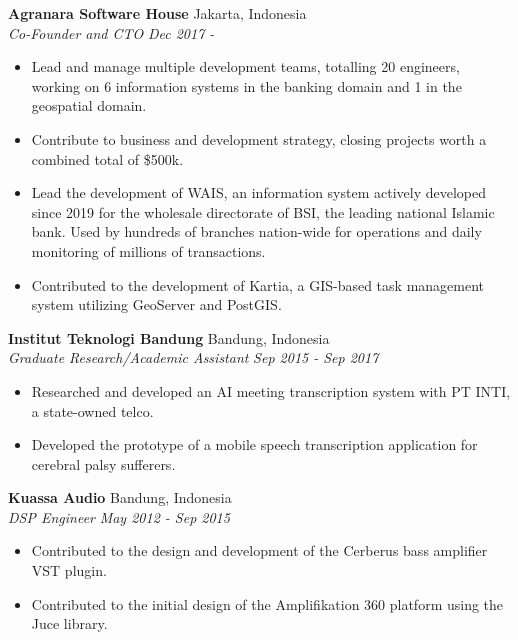 \documentclass{article}
\begin{document}
\textbf{Agranara Software House} \hfill Jakarta, Indonesia\\
\vspace{1mm}
\emph{Co-Founder and CTO} \hfill \emph{Dec 2017 -}\\
\vspace{-3mm}
\begin{itemize}[align=left, left=0pt..1em, itemsep=-2pt]
  \item Lead and manage multiple development teams, totalling 20 engineers,
    working on 6 information systems in the banking domain and 1 in the
    geospatial domain.
  \item Contribute to business and development strategy, closing projects
    worth a combined total of \$500k.
  \item Lead the development of WAIS, an information system actively
    developed since 2019 for the wholesale directorate of BSI, the leading
    national Islamic bank. Used by hundreds of branches nation-wide for
    operations and daily monitoring of millions of transactions.
  \item Contributed to the development of Kartia, a GIS-based task management
    system utilizing GeoServer and PostGIS. 
\end{itemize}

\textbf{Institut Teknologi Bandung} \hfill Bandung, Indonesia\\
\vspace{1mm}
\emph{Graduate Research/Academic Assistant} \hfill \emph{Sep 2015 - Sep 2017}\\
\vspace{-3mm}
\begin{itemize}[align=left, left=0pt..1em, itemsep=-2pt]
  \item Researched and developed an AI meeting transcription system with PT INTI, a
    state-owned telco.
  \item Developed the prototype of a mobile speech transcription application for
    cerebral palsy sufferers.
\end{itemize}

\textbf{Kuassa Audio} \hfill Bandung, Indonesia\\
\vspace{1mm}
\emph{DSP Engineer} \hfill \emph{May 2012 - Sep 2015}\\
\vspace{-3mm}
\begin{itemize}[align=left, left=0pt..1em, itemsep=-2pt]
  \item Contributed to the design and development of the Cerberus bass amplifier
    VST plugin.
  \item Contributed to the initial design of the Amplifikation 360 platform
    using the Juce library.
\end{itemize}
\end{document}
